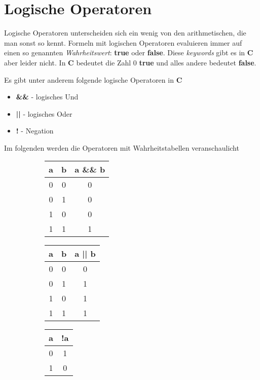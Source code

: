 \documentclass[c_worksheet.tex]{subfiles}
\begin{document}
\section{Logische Operatoren} 


Logische Operatoren unterscheiden sich ein wenig von den arithmetischen, die man sonst so kennt. Formeln mit logischen Operatoren evaluieren immer auf einen so genannten \emph{Wahrheitswert}: \textbf{true} oder \textbf{false}. Diese \emph{keywords} gibt es in \textbf{C} aber leider nicht. In \textbf{C} bedeutet die Zahl \(0\) \textbf{true} und alles andere bedeutet \textbf{false}.

Es gibt unter anderem folgende logische Operatoren in \textbf{C}

\begin{itemize}
	\item \textbf{\&\&} - logisches Und
	\item \textbf{||} - logisches Oder
	\item \textbf{!}  - Negation
\end{itemize}

Im folgenden werden die Operatoren mit Wahrheitstabellen veranschaulicht

\begin{figure}[H]
\begin{center}
\begin{subfigure}[b]{0.3\textwidth}
\centering
\begin{tabular}{ c | c | c }
a & b & a \&\& b \\
\hline
\hline
0 & 0 & 0 \\
\hline
0 & 1 & 0 \\
\hline
1 & 0 & 0 \\
\hline
1 & 1 & 1 \\
\end{tabular}
\end{subfigure}
\begin{subfigure}[b]{0.3\textwidth}
\centering
\begin{tabular}{ c | c | c }
a & b & a || b \\
\hline
\hline
0 & 0 & 0 \\
\hline
0 & 1 & 1 \\
\hline
1 & 0 & 1 \\
\hline
1 & 1 & 1 \\
\end{tabular}
\end{subfigure}
\begin{subfigure}[b]{0.3\textwidth}
\centering
\begin{tabular}{ c | c }
a & !a \\
\hline
\hline
0 & 1 \\
\hline
1 & 0 \\
\end{tabular}
\end{subfigure}
\end{center}
\end{figure}
\end{document}
